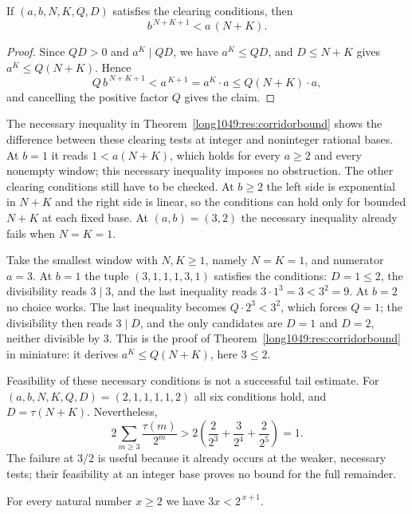 \documentclass[11pt]{article}
\begin{document}
\begin{theorem}\label{long1049:res:corridorbound}
If $(a,b,N,K,Q,D)$ satisfies the clearing conditions, then
\[
 b^{\,N+K+1}<a\,(N+K).
\]
\end{theorem}

\begin{proof}
Since $QD>0$ and $a^{K}\mid QD$, we have
$a^{K}\le QD$, and $D\le N+K$ gives
$a^{K}\le Q(N+K)$.  Hence
\[
 Q\,b^{\,N+K+1}<a^{\,K+1}=a^{K}\cdot a\le Q(N+K)\cdot a,
\]
and cancelling the positive factor $Q$ gives the claim.
\end{proof}

The necessary inequality in Theorem~\ref{long1049:res:corridorbound}
shows the difference between these clearing tests at integer and
noninteger rational bases.  At $b=1$ it reads $1<a(N+K)$, which holds for every
$a\ge2$ and every nonempty window; this necessary inequality imposes no
obstruction.  The other clearing conditions still have to be checked.
At $b\ge2$ the left side is exponential in $N+K$ and the right side is linear,
so the conditions can hold only for bounded $N+K$ at each fixed base.  At $(a,b)=(3,2)$ the
necessary inequality already fails when $N=K=1$.

\begin{example}\label{long1049:ex:corridor}
Take the smallest window with $N,K\ge1$, namely $N=K=1$, and numerator $a=3$.  At $b=1$ the tuple
$(3,1,1,1,3,1)$ satisfies the conditions: $D=1\le2$, the divisibility reads $3\mid3$, and
the last inequality reads $3\cdot1^{3}=3<3^{2}=9$. At $b=2$ no choice works.
The last inequality becomes $Q\cdot2^{3}<3^{2}$, which forces $Q=1$; the divisibility
then reads $3\mid D$, and the only candidates are $D=1$ and $D=2$, neither
divisible by $3$.  This is the proof of
Theorem~\ref{long1049:res:corridorbound} in miniature: it derives $a^{K}\le Q(N+K)$,
here $3\le2$.
\end{example}

Feasibility of these necessary conditions is not a successful tail
estimate. For $(a,b,N,K,Q,D)=(2,1,1,1,1,2)$ all six conditions hold,
and $D=\tau(N+K)$. Nevertheless,
\[
 2\sum_{m\ge3}\frac{\tau(m)}{2^m}
 >2\left(\frac2{2^3}+\frac3{2^4}+\frac2{2^5}\right)=1.
\]
The failure at $3/2$ is useful because it already occurs at the weaker,
necessary tests; their feasibility at an integer base proves no bound
for the full remainder.

\begin{proposition}\label{long1049:res:exp}
For every natural number $x\ge2$ we have $3x<2^{\,x+1}$.
\end{proposition}
\end{document}
